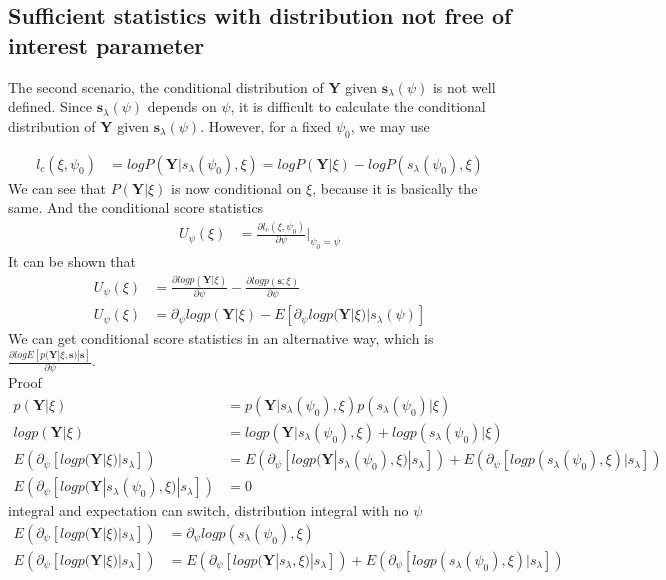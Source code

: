 \documentclass[11pt]{article} %
\begin{document}
\subsection{Sufficient statistics with distribution not free of interest parameter}

The second scenario, the conditional distribution of \textbf{Y} given $\textbf{s}_{\lambda}(\psi)$ is not well defined. Since $\textbf{s}_{\lambda}(\psi)$ depends on $\psi$, it is difficult to calculate the conditional distribution of \textbf{Y} given $\textbf{s}_{\lambda}(\psi)$. However, for a fixed $\psi_0$, we may use

\begin{align}
	l_c(\xi,\psi_0) &= log P(\textbf{Y}| s_{\lambda}(\psi_0), \xi) = log P(\textbf{Y}| \xi) - log P( s_{\lambda}(\psi_0), \xi)
\end{align}
We can see that $P(\textbf{Y}| \xi)$ is now conditional on $\xi$, because it is basically the same. And the conditional score statistics
\begin{align*}
	U_{\psi}(\xi) &= \frac{\partial l_c (\xi, \psi_0)}{\partial \psi}|_{\psi_0 = \psi}
\end{align*}
It can be shown that 
\begin{align*}
	U_{\psi}(\xi) &= \frac{\partial log p(\textbf{Y}| \xi)}{\partial \psi}  - \frac{\partial log p(\textbf{s}; \xi)}{\partial \psi} \\
	U_{\psi}(\xi) &= \partial_{\psi} log p(\textbf{Y}| \xi) - E[\partial_{\psi} log p(\textbf{Y}|\xi)| s_{\lambda}(\psi)]
\end{align*}
We can get conditional score statistics in an alternative way, which is $\frac{\partial log E[p(\textbf{Y}|\xi, \textbf{s})|\textbf{s}]}{\partial \psi}$.\\
Proof
\begin{align*}
	p(\textbf{Y}| \xi) &= p(\textbf{Y}|s_{\lambda}(\psi_0), \xi) p(s_{\lambda}(\psi_0) | \xi)\\
	log p(\textbf{Y}| \xi) &= log  p(\textbf{Y}|s_{\lambda}(\psi_0), \xi) + log p(s_{\lambda}(\psi_0) | \xi)\\
	E \left( \partial_{\psi}[log p(\textbf{Y}| \xi)| s_{\lambda}]\right) &= E \left(\partial_{\psi}[log  p(\textbf{Y}|s_{\lambda}(\psi_0), \xi)|s_{\lambda}]\right) + E \left(\partial_{\psi}[log p(s_{\lambda}(\psi_0), \xi)|s_{\lambda}]\right)\\
	E \left(\partial_{\psi}[log  p(\textbf{Y}|s_{\lambda}(\psi_0), \xi)|s_{\lambda}]\right) & = 0
\end{align*}
integral and expectation can switch, distribution integral with no $\psi$
\begin{align*}
	E \left( \partial_{\psi}[log p(\textbf{Y}| \xi)| s_{\lambda}]\right) &= \partial_{\psi}log p(s_{\lambda}(\psi_0),\xi)\\
	E \left( \partial_{\psi}[log p(\textbf{Y}| \xi)| s_{\lambda}]\right) &=  E \left( \partial_{\psi}[log p(\textbf{Y}| s_{\lambda},\xi)| s_{\lambda}]\right) + E \left(\partial_{\psi}[log p(s_{\lambda}(\psi_0), \xi)|s_{\lambda}]\right)
\end{align*}
\end{document}
